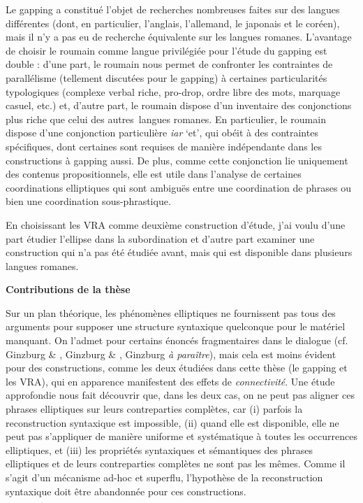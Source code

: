 Le gapping a constitué l'objet de recherches nombreuses faites sur des langues différentes (dont, en particulier, l'anglais, l'allemand, le japonais et le coréen), mais il n'y a pas eu de recherche équivalente sur les langues romanes. L'avantage de choisir le roumain comme langue privilégiée pour l'étude du gapping est double : d'une part, le roumain nous permet de confronter les contraintes de parallélisme (tellement discutées pour le gapping) à certaines particularités typologiques (complexe verbal riche, pro-drop, ordre libre des mots, marquage casuel, etc.) et, d'autre part, le roumain dispose d'un inventaire des conjonctions plus riche que celui des autres~langues romanes. En particulier, le roumain dispose d'une conjonction particulière \textit{iar} `et', qui obéit à des contraintes spécifiques, dont certaines sont requises de manière indépendante dans les constructions à gapping aussi. De plus, comme cette conjonction lie uniquement des contenus propositionnels, elle est utile dans l'analyse de certaines coordinations elliptiques qui sont ambiguës entre une coordination de phrases ou bien une coordination sous-phrastique. 

En choisissant les VRA comme deuxième construction d'étude, j'ai voulu d'une part étudier l'ellipse dans la subordination et d'autre part examiner une construction qui n'a pas été étudiée avant, mais qui est disponible dans plusieurs langues romanes. 

{\bfseries
Contributions de la thèse}

Sur un plan théorique, les phénomènes elliptiques ne fournissent pas tous des arguments pour supposer une structure syntaxique quelconque pour le matériel manquant. On l'admet pour certains énoncés fragmentaires dans le dialogue (cf. Ginzburg \& \citet{Sag2000}, Ginzburg \& \citet{Cooper2004}, Ginzburg \textit{à paraître}), mais cela est moins évident pour des constructions, comme les deux étudiées dans cette thèse (le gapping et les VRA), qui en apparence manifestent des effets de \textit{connectivité}. Une étude approfondie nous fait découvrir que, dans les deux cas, on ne peut pas aligner ces phrases elliptiques sur leurs contreparties complètes, car (i) parfois la reconstruction syntaxique est impossible, (ii) quand elle est disponible, elle ne peut pas s'appliquer de manière uniforme et systématique à toutes les occurrences elliptiques, et (iii) les propriétés syntaxiques et sémantiques des phrases elliptiques et de leurs contreparties complètes ne sont pas les mêmes. Comme il s'agit d'un mécanisme ad-hoc et superflu, l'hypothèse de la reconstruction syntaxique doit être abandonnée pour ces constructions. 

